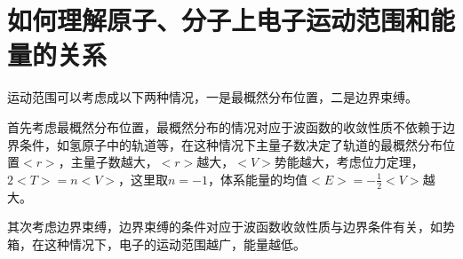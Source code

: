 \section{如何理解原子、分子上电子运动范围和能量的关系}
运动范围可以考虑成以下两种情况，一是最概然分布位置，二是边界束缚。

首先考虑最概然分布位置，最概然分布的情况对应于波函数的收敛性质不依赖于边界条件，如氢原子中的轨道等，在这种情况下主量子数决定了轨道的最概然分布位置$<r>$，主量子数越大，$<r>$越大，$<V>$势能越大，考虑位力定理，$2<T>=n<V>$，这里取$n=-1$，体系能量的均值$<E>=-\frac{1}{2}<V>$越大。

其次考虑边界束缚，边界束缚的条件对应于波函数收敛性质与边界条件有关，如势箱，在这种情况下，电子的运动范围越广，能量越低。
